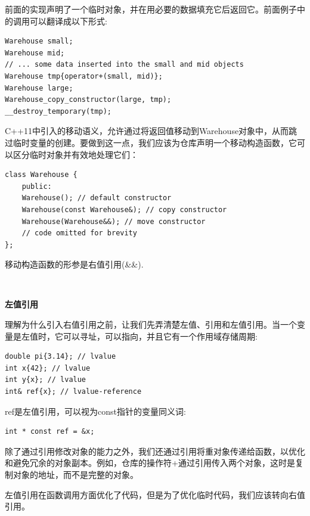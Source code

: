 前面的实现声明了一个临时对象，并在用必要的数据填充它后返回它。前面例子中的调用可以翻译成以下形式: \par

\begin{lstlisting}[caption={}]
Warehouse small;
Warehouse mid;
// ... some data inserted into the small and mid objects
Warehouse tmp{operator+(small, mid)};
Warehouse large;
Warehouse_copy_constructor(large, tmp);
__destroy_temporary(tmp);
\end{lstlisting}

C++11中引入的移动语义，允许通过将返回值移动到Warehouse对象中，从而跳过临时变量的创建。要做到这一点，我们应该为仓库声明一个移动构造函数，它可以区分临时对象并有效地处理它们： \par

\begin{lstlisting}[caption={}]
class Warehouse {
	public:
	Warehouse(); // default constructor
	Warehouse(const Warehouse&); // copy constructor
	Warehouse(Warehouse&&); // move constructor
	// code omitted for brevity
};
\end{lstlisting}

移动构造函数的形参是右值引用(\&\&). \par

\noindent\textbf{}\ \par
\textbf{左值引用} \ \par
理解为什么引入右值引用之前，让我们先弄清楚左值、引用和左值引用。当一个变量是左值时，它可以寻址，可以指向，并且它有一个作用域存储周期: \par

\begin{lstlisting}[caption={}]
double pi{3.14}; // lvalue
int x{42}; // lvalue
int y{x}; // lvalue
int& ref{x}; // lvalue-reference
\end{lstlisting}

ref是左值引用，可以视为const指针的变量同义词: \par

\begin{lstlisting}[caption={}]
int * const ref = &x;
\end{lstlisting}

除了通过引用修改对象的能力之外，我们还通过引用将重对象传递给函数，以优化和避免冗余的对象副本。例如，仓库的操作符+通过引用传入两个对象，这时是复制对象的地址，而不是完整的对象。 \par
左值引用在函数调用方面优化了代码，但是为了优化临时代码，我们应该转向右值引用。 \par

